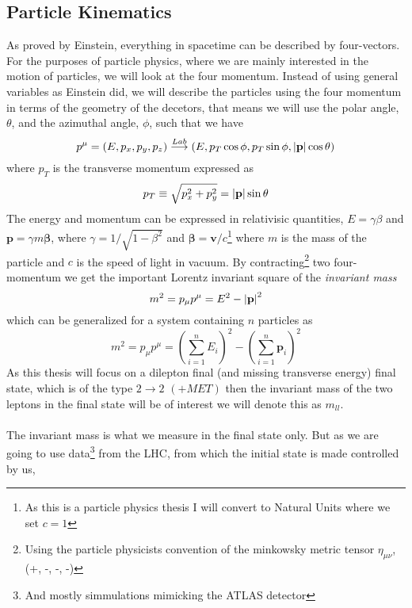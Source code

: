 \documentclass[14pt, a4paper]{book}
\begin{document}
\subsection{Particle Kinematics}
As proved by Einstein, everything in spacetime can be described by four-vectors. For the purposes of particle physics, where we are mainly interested in the motion of particles, 
we will look at the four momentum. Instead of using general variables as Einstein did, we will describe the particles using the four momentum in terms of the geometry of the decetors, that means we will use 
the polar angle, $\theta$, and the azimuthal angle, $\phi$, such that we have
\begin{equation}\label{eq:four-momentum}
    p^\mu = (E, p_x, p_y, p_z) \overset{Lab}{\longrightarrow} (E, p_T\cos\phi, p_T\sin\phi, \abs{\mathbf{p}}\cos\theta)
\end{equation}
where $p_T$ is the transverse momentum expressed as
\begin{equation}\label{eq:transverse_momentum}
    p_T \equiv\sqrt{p_x^2 +p_y^2} = \abs{\mathbf{p}}\sin\theta
\end{equation}
The energy and momentum can be expressed in relativisic quantities, $E=\gamma\beta$ and $\mathbf{p}=\gamma m\bm\beta$, where $\gamma = 1/\sqrt{1-\beta^2}$ and $\bm\beta = \mathbf{v}/c$\footnote{As this is a particle physics thesis I will convert to Natural Units where we set $c=1$} 
where $m$ is the mass of the particle 
and $c$ is the speed of light in vacuum. By contracting\footnote{Using the particle physicists convention of the minkowsky metric tensor $\eta_{\mu\nu}$,  (+, -, -, -)} two four-momentum we get the important Lorentz invariant 
square of the \textit{invariant mass}
$$
    m^2 = p_\mu p^\mu = E^2 - \abs{\mathbf{p}}^2 
$$
which can be generalized for a system containing $n$ particles as
\begin{equation}\label{eq:invariant_mass}
    m^2 = p_\mu p^\mu = \left(\sum_{i=1}^n E_i\right)^2 - \left(\sum_{i=1}^n\mathbf{p}_i\right)^2
\end{equation}
As this thesis will focus on a dilepton final (and missing transverse energy) final state, which is of the type $2\rightarrow2$ $(+MET)$ then the invariant mass of the two leptons in the final state will be of interest 
we will denote this as $m_{ll}$. \\
\\ The invariant mass is what we measure in the final state only. But as we are going to use data\footnote{And mostly simmulations mimicking the ATLAS detector} from the LHC, from which the initial state is made controlled by us, 
\end{document}
